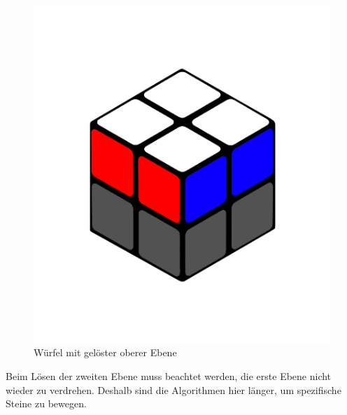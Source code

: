 \documentclass[12pt,a4paper, usenames, dvipsnames]{article}
\begin{document}
\begin{figure}[h]
\centering
\includegraphics[scale=0.1]{ebene.png}
\caption{Würfel mit gelöster oberer Ebene}
\end{figure}

Beim Lösen der zweiten Ebene muss beachtet werden, die erste Ebene nicht wieder zu verdrehen. Deshalb sind die Algorithmen hier länger, um spezifische Steine zu bewegen.



%
%
%
%
%
%
%
%
%
%
%
%
%
%
%
%
%
%
%
\newpage


\begin{singlespacing}
\listoffigures
\end{singlespacing}



\newpage


\printbibliography
\end{document}

